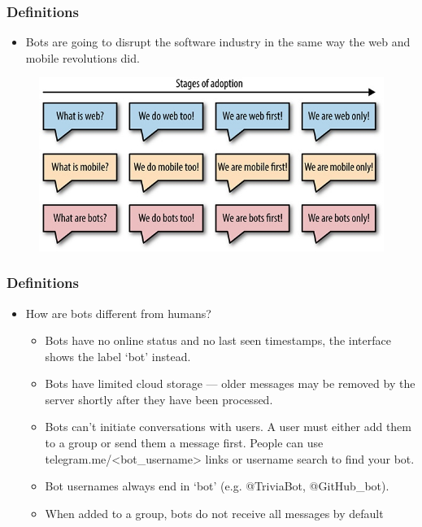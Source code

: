 \documentclass[11pt]{beamer}
\begin{document}
\begin{frame}
\frametitle{Definitions}
\begin{itemize}
	\item Bots are going to disrupt the software industry in the same way the web and mobile revolutions did.
	
\end{itemize}
\begin{figure}[h]
	\centering
	\includegraphics[scale=.2]{images/four-phases-of-adoption}
	\label{trello}
\end{figure}
\end{frame}

\begin{frame}
\frametitle{Definitions}
\begin{itemize}
	\item How are bots different from humans?
	\begin{itemize}
		\item Bots have no online status and no last seen timestamps, the interface shows the label ‘bot’ instead.
		\item Bots have limited cloud storage — older messages may be removed by the server shortly after they have been processed.
		\item Bots can't initiate conversations with users. A user must either add them to a group or send them a message first. People can use telegram.me/<bot\_username> links or username search to find your bot.
		\item Bot usernames always end in ‘bot’ (e.g. @TriviaBot, @GitHub\_bot).
		\item When added to a group, bots do not receive all messages by default
	\end{itemize}
\end{itemize}
\end{frame}
\end{document}
